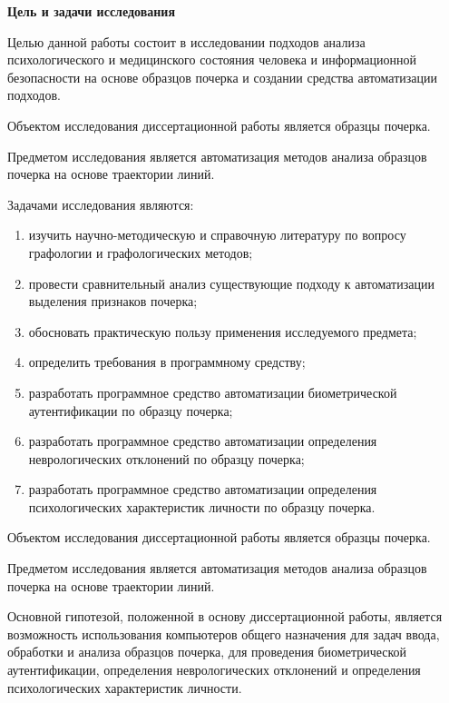 \label{sec:general_overview}

\newcommand{\totpages}{\number\numexpr\getpagerefnumber{LastPage}}

\textbf{Цель и задачи исследования}
\bigskip

Целью данной работы состоит в исследовании подходов анализа психологического и медицинского состояния человека и информационной безопасности на основе образцов почерка и создании средства автоматизации подходов.

Объектом исследования диссертационной работы является образцы почерка.

Предметом исследования является автоматизация методов анализа образцов почерка на основе траектории линий.

Задачами исследования являются:
\begin{enumerate}
  \item изучить научно-методическую и справочную литературу по вопросу графологии и графологических методов;
  \item провести сравнительный анализ существующие подходу к автоматизации выделения признаков почерка;
  \item обосновать практическую пользу применения исследуемого \mbox{предмета};
  \item определить требования в программному средству;
  \item разработать программное средство автоматизации биометрической аутентификации по образцу почерка;
  \item разработать программное средство автоматизации определения неврологических отклонений по образцу почерка;
  \item разработать программное средство автоматизации определения психологических характеристик личности по образцу почерка.
\end{enumerate}
Объектом исследования диссертационной работы является образцы почерка.

Предметом исследования является автоматизация методов анализа образцов почерка на основе траектории линий.

Основной гипотезой, положенной в основу диссертационной работы, является возможность использования компьютеров общего назначения для задач ввода, обработки и анализа образцов почерка, для проведения биометрической аутентификации, определения неврологических отклонений и определения психологических характеристик личности. 

